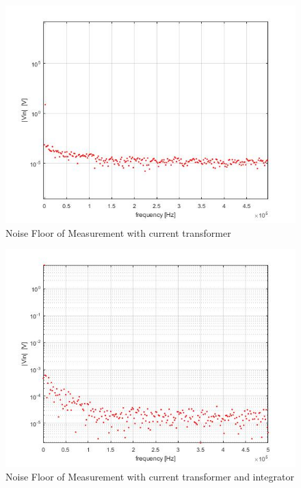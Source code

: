 \begin{figure}[htbp]
 \centering
 \centerline{\includegraphics[scale=0.3]{figures/Results/NoiseFloor/currenttransformer.jpg}}

\caption[Kurze Abbildungsbeschreibung]{Noise Floor of Measurement with current transformer }
\label{fig.noisefloorcurrentt}
\end{figure}

\begin{figure}[htbp]
 \centering
 \centerline{\includegraphics[scale=0.3]{figures/Results/NoiseFloor/Integrator.jpg}}

\caption[Kurze Abbildungsbeschreibung]{Noise Floor of Measurement with current transformer and integrator }
\label{fig.noisefloorintegrator}
\end{figure}





